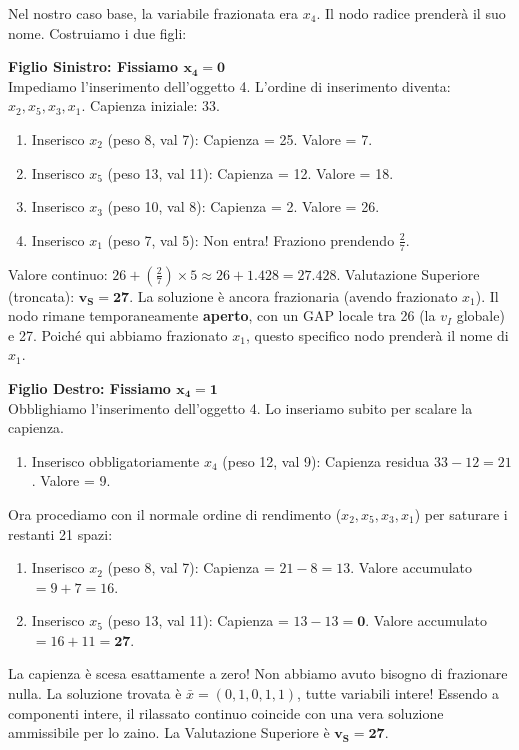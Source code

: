 \documentclass[12pt, a4paper]{article}
\begin{document}
	Nel nostro caso base, la variabile frazionata era $x_4$. Il nodo radice prenderà il suo nome.
	Costruiamo i due figli:
	
	\textbf{Figlio Sinistro: Fissiamo $\mathbf{x_4 = 0}$}\\
	Impediamo l'inserimento dell'oggetto 4. L'ordine di inserimento diventa: $x_2, x_5, x_3, x_1$.
	Capienza iniziale: 33.
	\begin{enumerate}
		\item Inserisco $x_2$ (peso 8, val 7): Capienza = 25. Valore = 7.
		\item Inserisco $x_5$ (peso 13, val 11): Capienza = 12. Valore = 18.
		\item Inserisco $x_3$ (peso 10, val 8): Capienza = 2. Valore = 26.
		\item Inserisco $x_1$ (peso 7, val 5): Non entra! Fraziono prendendo $\frac{2}{7}$.
	\end{enumerate}
	Valore continuo: $26 + \left(\frac{2}{7}\right) \times 5 \approx 26 + 1.428 = 27.428$.
	Valutazione Superiore (troncata): $\mathbf{v_S = 27}$. 
	La soluzione è ancora frazionaria (avendo frazionato $x_1$). Il nodo rimane temporaneamente \textbf{aperto}, con un GAP locale tra 26 (la $v_I$ globale) e 27. Poiché qui abbiamo frazionato $x_1$, questo specifico nodo prenderà il nome di $x_1$.
	
	\textbf{Figlio Destro: Fissiamo $\mathbf{x_4 = 1}$}\\
	Obblighiamo l'inserimento dell'oggetto 4. Lo inseriamo subito per scalare la capienza.
	\begin{enumerate}
		\item Inserisco obbligatoriamente $x_4$ (peso 12, val 9): Capienza residua $33 - 12 = 21$. Valore = 9.
	\end{enumerate}
	Ora procediamo con il normale ordine di rendimento ($x_2, x_5, x_3, x_1$) per saturare i restanti 21 spazi:
	\begin{enumerate}[resume]
		\item Inserisco $x_2$ (peso 8, val 7): Capienza = $21 - 8 = 13$. Valore accumulato $= 9 + 7 = 16$.
		\item Inserisco $x_5$ (peso 13, val 11): Capienza = $13 - 13 = \mathbf{0}$. Valore accumulato $= 16 + 11 = \mathbf{27}$.
	\end{enumerate}
	La capienza è scesa esattamente a zero! Non abbiamo avuto bisogno di frazionare nulla. 
	La soluzione trovata è $\bar{x} = (0, 1, 0, 1, 1)$, tutte variabili intere! Essendo a componenti intere, il rilassato continuo coincide con una vera soluzione ammissibile per lo zaino.
	La Valutazione Superiore è $\mathbf{v_S = 27}$. 
	
\end{document}
